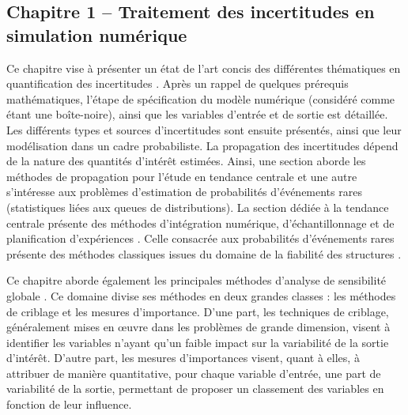 \subsection*{Chapitre 1 -- Traitement des incertitudes en simulation num\'{e}rique}
Ce chapitre vise à pr\'{e}senter un \'{e}tat de l'art concis des diff\'{e}rentes th\'{e}matiques en quantification des incertitudes \citep{sullivan_2015}. 
Après un rappel de quelques pr\'{e}requis math\'{e}matiques, l'\'{e}tape de sp\'{e}cification du modèle num\'{e}rique (consid\'{e}r\'{e} comme \'{e}tant une boîte-noire), ainsi que les variables d'entr\'{e}e et de sortie est d\'{e}taill\'{e}e. 
Les diff\'{e}rents types et sources d'incertitudes sont ensuite pr\'{e}sent\'{e}s, ainsi que leur mod\'{e}lisation dans un cadre probabiliste. 
La propagation des incertitudes d\'{e}pend de la nature des quantit\'{e}s d'int\'{e}rêt estim\'{e}es. 
Ainsi, une section aborde les m\'{e}thodes de propagation pour l'\'{e}tude en tendance centrale et une autre s'int\'{e}resse aux problèmes d'estimation de probabilit\'{e}s d'\'{e}v\'{e}nements rares (statistiques li\'{e}es aux queues de distributions). 
La section d\'{e}di\'{e}e à la tendance centrale pr\'{e}sente des m\'{e}thodes d'int\'{e}gration num\'{e}rique, d'\'{e}chantillonnage et de planification d'exp\'{e}riences \citep{fang_liu_2018}. 
Celle consacr\'{e}e aux probabilit\'{e}s d'\'{e}v\'{e}nements rares pr\'{e}sente des m\'{e}thodes classiques issues du domaine de la fiabilit\'{e} des structures \citep{lemaire_2009,MorioBalesdent2015}.

Ce chapitre aborde \'{e}galement les principales m\'{e}thodes d'analyse de sensibilit\'{e} globale \citep{daveiga_iooss_2021}. 
Ce domaine divise ses m\'{e}thodes en deux grandes classes : les m\'{e}thodes de criblage et les mesures d'importance. 
D'une part, les techniques de criblage, g\'{e}n\'{e}ralement mises en \oe{}uvre dans les problèmes de grande dimension, visent à identifier les variables n'ayant qu'un faible impact sur la variabilit\'{e} de la sortie d'int\'{e}rêt. 
D'autre part, les mesures d'importances visent, quant à elles, à attribuer de manière quantitative, pour chaque variable d'entr\'{e}e, une part de variabilit\'{e} de la sortie, permettant de proposer un classement des variables en fonction de leur influence.

